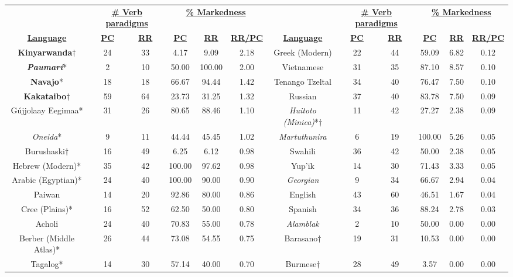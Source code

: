 \begin{tabular}{cccccccccccc}
 & \multicolumn{2}{c}{\underline{\textbf{\# Verb paradigms}}} & \multicolumn{3}{c}{\underline{\textbf{\% Markedness}}} & & \multicolumn{2}{c}{\underline{\textbf{\# Verb paradigms}}} & \multicolumn{3}{c}{\underline{\textbf{\% Markedness}}} \\
\underline{\textbf{Language}} & \underline{\textbf{PC}} & \underline{\textbf{RR}} & \underline{\textbf{PC}} & \underline{\textbf{RR}} & \underline{\textbf{RR/PC}} & \underline{\textbf{Language}} & \underline{\textbf{PC}} & \underline{\textbf{RR}} & \underline{\textbf{PC}} & \underline{\textbf{RR}} & \underline{\textbf{RR/PC}} \\
\textbf{Kinyarwanda}$\dagger$ & 24 & 33 & 4.17 & 9.09 & 2.18 & Greek (Modern) & 22 & 44 & 59.09 & 6.82 & 0.12 \\
\emph{\textbf{Paumarí}}* & 2 & 10 & 50.00 & 100.00 & 2.00 & Vietnamese & 31 & 35 & 87.10 & 8.57 & 0.10 \\
\textbf{Navajo}* & 18 & 18 & 66.67 & 94.44 & 1.42 & Tenango Tzeltal & 34 & 40 & 76.47 & 7.50 & 0.10 \\
\textbf{Kakataibo}$\dagger$ & 59 & 64 & 23.73 & 31.25 & 1.32 & Russian & 37 & 40 & 83.78 & 7.50 & 0.09 \\
Gújjolaay Eegimaa* & 31 & 26 & 80.65 & 88.46 & 1.10 & \emph{Huitoto (Minica)}*$\dagger$ & 11 & 42 & 27.27 & 2.38 & 0.09 \\
\emph{Oneida}* & 9 & 11 & 44.44 & 45.45 & 1.02 & \emph{Martuthunira} & 6 & 19 & 100.00 & 5.26 & 0.05 \\
Burushaski$\dagger$ & 16 & 49 & 6.25 & 6.12 & 0.98 & Swahili & 36 & 42 & 50.00 & 2.38 & 0.05 \\
Hebrew (Modern)* & 35 & 42 & 100.00 & 97.62 & 0.98 & Yup'ik & 14 & 30 & 71.43 & 3.33 & 0.05 \\
Arabic (Egyptian)* & 24 & 40 & 100.00 & 90.00 & 0.90 & \emph{Georgian} & 9 & 34 & 66.67 & 2.94 & 0.04 \\
Paiwan & 14 & 20 & 92.86 & 80.00 & 0.86 & English & 43 & 60 & 46.51 & 1.67 & 0.04 \\
Cree (Plains)* & 16 & 52 & 62.50 & 50.00 & 0.80 & Spanish & 34 & 36 & 88.24 & 2.78 & 0.03 \\
Acholi & 24 & 40 & 70.83 & 55.00 & 0.78 & \emph{Alamblak} & 2 & 10 & 50.00 & 0.00 & 0.00 \\
Berber (Middle Atlas)* & 26 & 44 & 73.08 & 54.55 & 0.75 & Barasano$\dagger$ & 19 & 31 & 10.53 & 0.00 & 0.00 \\
Tagalog* & 14 & 30 & 57.14 & 40.00 & 0.70 & Burmese$\dagger$ & 28 & 49 & 3.57 & 0.00 & 0.00 \\

\end{tabular}
